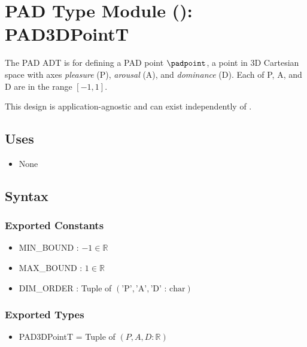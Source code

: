 \section{PAD Type Module (): PAD3DPointT}\label{padModule}
The PAD ADT is for defining a PAD point $\padpoint$, a point in 3D Cartesian
space with axes \textit{pleasure} (P), \textit{arousal} (A), and
\textit{dominance} (D). Each of P, A, and D are in the range $[-1, 1]$.

This design is application-agnostic and can exist independently of \progname{}.

\subsection{Uses}
\begin{itemize}[noitemsep, nosep]

    \item None

\end{itemize}

\subsection{Syntax}

\subsubsection{Exported Constants}

\begin{itemize}

    \item MIN\_BOUND : $-1 \in \mathbb{R}$

    \item MAX\_BOUND : $1 \in \mathbb{R}$

    \item DIM\_ORDER : Tuple of $\left( \text{'P'}, \text{'A'}, \text{'D' :
    char} \right)$

\end{itemize}

\subsubsection{Exported Types}

\begin{itemize}

    \item PAD3DPointT = Tuple of $\left( P, A, D : \mathbb{R} \right)$

\end{itemize}

